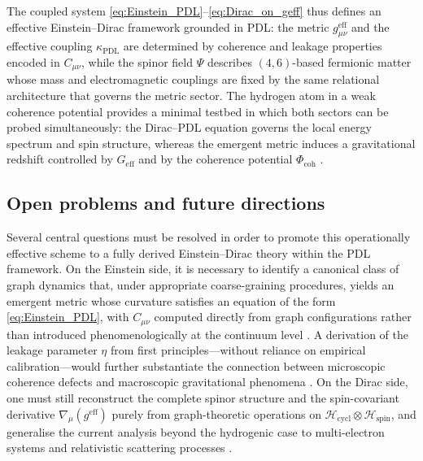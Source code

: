 \documentclass[11pt,a4paper]{article}
\theoremstyle{definition}
\newcommand{\PDL}{\mathrm{PDL}}
\newcommand{\Hspin}{\mathcal{H}_{\mathrm{spin}}}
\newcommand{\Hcycl}{\mathcal{H}_{\mathrm{cycl}}}
\newcommand{\Geff}{G_{\mathrm{eff}}}
\newcommand{\etaL}{\eta} %
\newcommand{\Ccoh}{C_{\mu\nu}} %
\begin{document}
The coupled system \eqref{eq:Einstein_PDL}–\eqref{eq:Dirac_on_geff} thus defines an effective Einstein–Dirac framework grounded in PDL: the metric $g_{\mu\nu}^{\mathrm{eff}}$ and the effective coupling $\kappa_{\PDL}$ are determined by coherence and leakage properties encoded in $\Ccoh$, while the spinor field $\Psi$ describes $(4,6)$-based fermionic matter whose mass and electromagnetic couplings are fixed by the same relational architecture that governs the metric sector. The hydrogen atom in a weak coherence potential provides a minimal testbed in which both sectors can be probed simultaneously: the Dirac–PDL equation governs the local energy spectrum and spin structure, whereas the emergent metric induces a gravitational redshift controlled by $\Geff$ and by the coherence potential $\Phi_{\mathrm{coh}}$ \cite{PDL_Global_Mapping_Structures_Results_Open_Problems,A_Topological_Reformulation_in_the_Projective_Dynamic_Logo_Framework_Hierarchical_Coherence_Filtering_and_the_Exponent_18_in_PDL}.

\subsection{Open problems and future directions}

Several central questions must be resolved in order to promote this operationally effective scheme to a fully derived Einstein–Dirac theory within the PDL framework. On the Einstein side, it is necessary to identify a canonical class of graph dynamics that, under appropriate coarse-graining procedures, yields an emergent metric whose curvature satisfies an equation of the form \eqref{eq:Einstein_PDL}, with $\Ccoh$ computed directly from graph configurations rather than introduced phenomenologically at the continuum level \cite{PDL_Global_Mapping_Structures_Results_Open_Problems}. A derivation of the leakage parameter $\etaL$ from first principles—without reliance on empirical calibration—would further substantiate the connection between microscopic coherence defects and macroscopic gravitational phenomena \cite{A_Topological_Reformulation_in_the_Projective_Dynamic_Logo_Framework_Hierarchical_Coherence_Filtering_and_the_Exponent_18_in_PDL,Hierarchical_Coherence_Filtering_and_the_Exponent_18_in_PDL}. On the Dirac side, one must still reconstruct the complete spinor structure and the spin-covariant derivative $\nabla_\mu(g^{\mathrm{eff}})$ purely from graph-theoretic operations on $\Hcycl \otimes \Hspin$, and generalise the current analysis beyond the hydrogenic case to multi-electron systems and relativistic scattering processes \cite{Sketch_derivation_Schroedinger_PDL,PDL_Global_Mapping_Structures_Results_Open_Problems}.
\end{document}

